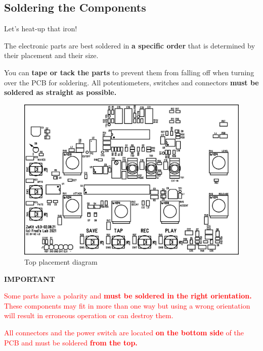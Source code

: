 \documentclass{scrartcl}
\begin{document}
\pagebreak
\subsection{Soldering the Components}
\Large
Let's heat-up that iron!
\normalsize

The electronic parts are best soldered in \textbf{a specific order} that is determined by their placement and their size.

You can \textbf{tape or tack the parts} to prevent them from falling off when turning over the PCB for soldering.
All potentiometers, switches and connectors \textbf{must be soldered as straight as possible.}

\begin{figure}[!ht]
    \begin{center}
        \includegraphics[scale=0.70]{assets/pcb-top.png}
        \caption{Top placement diagram}
    \end{center}
\end{figure}

\vspace{0.5cm}
\textbf{IMPORTANT}

\begin{tcolorbox}
    \textcolor{red}{
        Some parts have a polarity and \textbf{must be soldered in the right orientation.} These components may fit in more than one way but using a wrong orientation will result in erroneous operation or can destroy them.
    }
\end{tcolorbox}

\vspace{0.25cm}

\begin{tcolorbox}
    \textcolor{red}{
        All connectors and the power switch are located \textbf{on the bottom side} of the PCB and must be soldered \textbf{from the top.}
    }
\end{tcolorbox}
\end{document}
